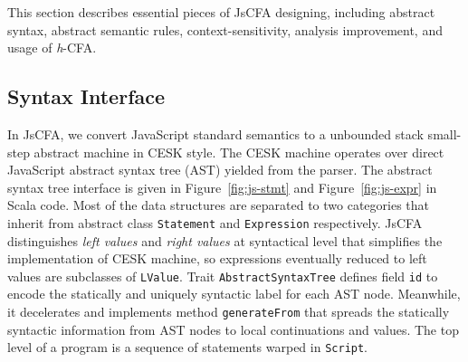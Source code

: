 \documentclass{article}
\begin{document}
This section describes essential pieces of JsCFA designing, including abstract syntax, abstract semantic rules, context-sensitivity, analysis improvement, and usage of \textit{h}-CFA\@.

\subsection{Syntax Interface}
\label{sub:Syntax}

In JsCFA, we convert JavaScript standard semantics to a unbounded stack small-step abstract machine in CESK style.
The CESK machine operates over direct JavaScript abstract syntax tree (AST) yielded from the parser.
 The abstract syntax tree interface is given in Figure~\ref{fig:js-stmt} and Figure~\ref{fig:js-expr} in Scala code.
Most of the data structures are separated to two categories that inherit from abstract class \verb|Statement| and \verb|Expression| respectively.
JsCFA distinguishes \emph{left values} and \emph{right values} at syntactical level that simplifies the implementation of CESK machine, so expressions eventually reduced to left values are subclasses of \verb|LValue|.
Trait \verb|AbstractSyntaxTree| defines field \verb|id| to encode the statically and uniquely syntactic label for each AST node. Meanwhile, it decelerates and implements method \verb|generateFrom| that spreads the statically syntactic information from AST nodes to local continuations and values.
The top level of a program is a sequence of statements warped in \verb|Script|.
\end{document}
